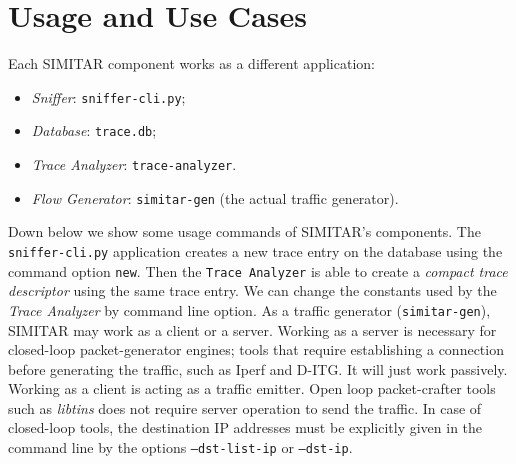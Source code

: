 \section{Usage and Use Cases}

Each SIMITAR component works as a different application:

\begin{itemize}
	\item \textit{Sniffer}: \texttt{sniffer-cli.py};
	\item \textit{Database}: \texttt{trace.db};
	\item \textit{Trace Analyzer}: \texttt{trace-analyzer}.
	\item \textit{Flow Generator}: \texttt{simitar-gen} (the actual traffic generator).
\end{itemize}


Down below we show some usage commands of SIMITAR's components. The \texttt{sniffer-cli.py} application creates a new trace entry on the database using the command option \texttt{new}. Then the \texttt{Trace Analyzer} is able to create a \textit{compact trace descriptor} using the same trace entry. We can change the constants used by the \textit{Trace Analyzer} by command line option. As a traffic generator (\texttt{simitar-gen}), SIMITAR may work as a client or a server. Working as a server is necessary for closed-loop packet-generator engines; tools that require establishing a connection before generating the traffic, such as Iperf and D-ITG. It will just work passively. Working as a client is acting as a traffic emitter. Open loop packet-crafter tools such as \textit{libtins} does not require server operation to send the traffic. In case of closed-loop tools, the destination IP addresses must be explicitly given in the command line by the options \texttt{--dst-list-ip} or \texttt{--dst-ip}. 


